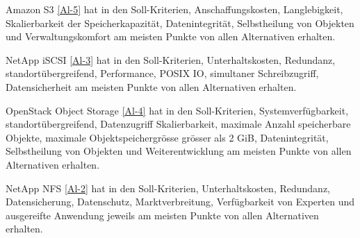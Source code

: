 Amazon S3 \ref{Al-5} hat in den Soll-Kriterien, Anschaffungskosten, Langlebigkeit, Skalierbarkeit der Speicherkapazität, Datenintegrität, Selbstheilung von Objekten und Verwaltungskomfort am meisten Punkte von allen Alternativen erhalten.

NetApp iSCSI \ref{Al-3} hat in den Soll-Kriterien, Unterhaltskosten, Redundanz, standortübergreifend, Performance, POSIX IO, simultaner Schreibzugriff, Datensicherheit am meisten Punkte von allen Alternativen erhalten.

OpenStack Object Storage \ref{Al-4} hat in den Soll-Kriterien, Systemverfügbarkeit, standortübergreifend, Datenzugriff Skalierbarkeit, maximale Anzahl speicherbare Objekte, maximale Objektspeichergrösse grösser als 2 GiB, Datenintegrität, Selbstheilung von Objekten und Weiterentwicklung am meisten Punkte von allen Alternativen erhalten.

NetApp NFS \ref{Al-2} hat in den Soll-Kriterien, Unterhaltskosten, Redundanz, Datensicherung,  Datenschutz, Marktverbreitung, Verfügbarkeit von Experten und ausgereifte Anwendung jeweils am meisten Punkte von allen Alternativen erhalten.








